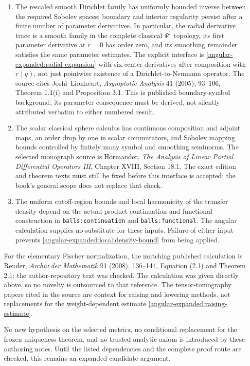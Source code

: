 \documentclass[11pt]{article}
\theoremstyle{definition}
\theoremstyle{remark}
\numberwithin{equation}{section}
\begin{document}
\begin{enumerate}
\item The rescaled smooth Dirichlet family has uniformly bounded inverse
between the required Sobolev spaces; boundary and interior regularity
persist after a finite number of parameter derivatives.  In particular,
the radial derivative trace is a smooth family in the complete classical
$\Psi^1$ topology, its first parameter derivative at $r=0$ has order zero,
and its smoothing remainder satisfies the same parameter estimates.
The explicit interface is \eqref{angular-expanded:radial-expansion} with six center
derivatives after composition with $r(y)$, not just pointwise existence
of a Dirichlet-to-Neumann operator.  The source cites Joshi--Lionheart,
\emph{Asymptotic Analysis} 41 (2005), 93--106, Theorem 1.1(i) and
Proposition 3.1.  This is published boundary-symbol background; its
parameter consequence must be derived, not silently attributed verbatim
to either numbered result.
\item The scalar classical sphere calculus has continuous composition and
adjoint maps, an order drop by one in scalar commutators, and Sobolev
mapping bounds controlled by finitely many symbol and smoothing
seminorms.  The selected monograph source is H\"ormander,
\emph{The Analysis of Linear Partial Differential Operators III},
Chapter XVIII, Section 18.1.  The exact edition and theorem texts must
still be fixed before this interface is accepted; the book's general
scope does not replace that check.
\item The uniform cutoff-region bounds and local harmonicity of the
transfer density depend on the actual product continuation and functional
construction in \texttt{balls:continuation} and \texttt{balls:functional}.
The angular calculation supplies no substitute for these inputs.  Failure
of either input prevents \eqref{angular-expanded:local:density-bound} from being applied.
\end{enumerate}

For the elementary Fischer normalization, the matching published
calculation is Render, \emph{Archiv der Mathematik} 91 (2008), 136--144,
Equation (2.1) and Theorem 2.1; the author-repository text was checked.
The calculation was given directly above, so no novelty is outsourced to
that reference.  The tensor-tomography papers cited in the source are
context for raising and lowering methods, not replacements for the
weight-dependent estimate \eqref{angular-expanded:raising-estimate}.

No new hypothesis on the selected metrics, no conditional replacement for
the frozen uniqueness theorem, and no trusted analytic axiom is introduced
by these authoring notes.  Until the listed dependencies and the complete
proof route are checked, this remains an expanded candidate argument.
\end{document}
